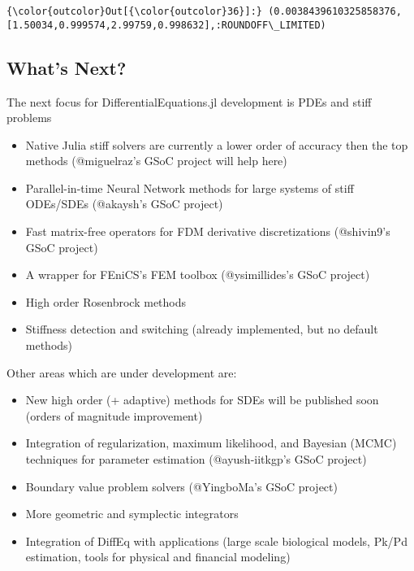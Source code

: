 \documentclass[11pt]{article}
\begin{document}
            \begin{Verbatim}[commandchars=\\\{\}]
{\color{outcolor}Out[{\color{outcolor}36}]:} (0.0038439610325858376,[1.50034,0.999574,2.99759,0.998632],:ROUNDOFF\_LIMITED)
\end{Verbatim}
        
    \subsection{What's Next?}\label{whats-next}

The next focus for DifferentialEquations.jl development is PDEs and
stiff problems

\begin{itemize}
\itemsep1pt\parskip0pt
\item
  Native Julia stiff solvers are currently a lower order of accuracy
  then the top methods (@miguelraz's GSoC project will help here)
\item
  Parallel-in-time Neural Network methods for large systems of stiff
  ODEs/SDEs (@akaysh's GSoC project)
\item
  Fast matrix-free operators for FDM derivative discretizations
  (@shivin9's GSoC project)
\item
  A wrapper for FEniCS's FEM toolbox (@ysimillides's GSoC project)
\item
  High order Rosenbrock methods
\item
  Stiffness detection and switching (already implemented, but no default
  methods)
\end{itemize}

    Other areas which are under development are:

\begin{itemize}
\itemsep1pt\parskip0pt
\item
  New high order (+ adaptive) methods for SDEs will be published soon
  (orders of magnitude improvement)
\item
  Integration of regularization, maximum likelihood, and Bayesian (MCMC)
  techniques for parameter estimation (@ayush-iitkgp's GSoC project)
\item
  Boundary value problem solvers (@YingboMa's GSoC project)
\item
  More geometric and symplectic integrators
\item
  Integration of DiffEq with applications (large scale biological
  models, Pk/Pd estimation, tools for physical and financial modeling)
\end{itemize}


    
    
    
    
\end{document}
